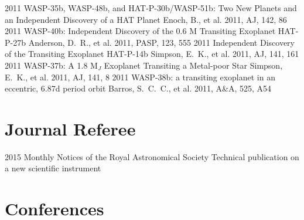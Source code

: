 \documentclass[print]{friggeri-cv} %
\begin{document}
\begin{entrylist}
\entry
{\small 2011}
{\normalfont \small WASP-35b, WASP-48b, and HAT-P-30b/WASP-51b: Two New Planets and an Independent Discovery of a HAT Planet}
{}
{\small Enoch, B., et al. 2011, AJ, 142, 86}
\entry
{\small 2011}
{\normalfont \small WASP-40b: Independent Discovery of the 0.6 M Transiting Exoplanet HAT-P-27b}
{}
{\small Anderson, D.~R., et al. 2011, PASP, 123, 555}
\entry
{\small 2011}
{\normalfont \small Independent Discovery of the Transiting Exoplanet HAT-P-14b}
{}
{\small Simpson, E.~K., et al. 2011, AJ, 141, 161}
\entry
{\small 2011}
{\normalfont \small WASP-37b: A 1.8 M$_{J}$ Exoplanet Transiting a Metal-poor Star}
{}
{\small Simpson, E.~K., et al. 2011, AJ, 141, 8}
\entry
{\small 2011}
{\normalfont \small WASP-38b: a transiting exoplanet in an eccentric, 6.87d period orbit}
{}
{\small Barros, S.~C.~C., et al. 2011, A\&A, 525, A54}
\end{entrylist}


\section{Journal Referee}
\begin{entrylist}
\entry
{\small 2015}
{\small Monthly Notices of the Royal Astronomical Society}
{}
{\small Technical publication on a new scientific instrument}

\end{entrylist}


\section{Conferences}
\end{document}
